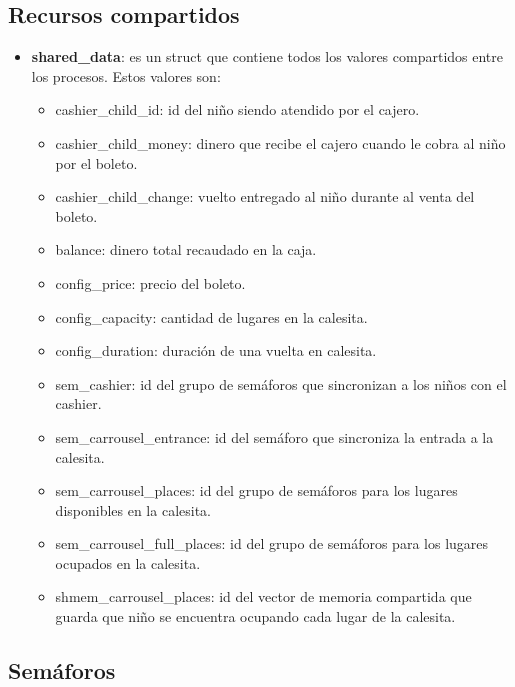 \documentclass[a4paper,10pt]{article}
\begin{document}
\subsection{Recursos compartidos}

\begin{itemize}
\item \textbf{shared\_data}: es un struct que contiene todos los valores compartidos entre los procesos. Estos valores son:
\begin{itemize}
\item cashier\_child\_id: id del niño siendo atendido por el cajero.
\item cashier\_child\_money: dinero que recibe el cajero cuando le cobra al niño por el boleto.
\item cashier\_child\_change: vuelto entregado al niño durante al venta del boleto.
\\
\item balance: dinero total recaudado en la caja.
\\
\item config\_price: precio del boleto.
\item config\_capacity: cantidad de lugares en la calesita.
\item config\_duration: duración de una vuelta en calesita.
\\
\item sem\_cashier: id del grupo de semáforos que sincronizan a los niños con el cashier.
\item sem\_carrousel\_entrance: id del semáforo que sincroniza la entrada a la calesita.
\item sem\_carrousel\_places: id del grupo de semáforos para los lugares disponibles en la calesita.
\item sem\_carrousel\_full\_places: id del grupo de semáforos para los lugares ocupados en la calesita.
\\
\item shmem\_carrousel\_places: id del vector de memoria compartida que guarda que niño se encuentra ocupando cada lugar de la calesita.
\end{itemize}
\end{itemize}

\subsection{Semáforos}
\end{document}
